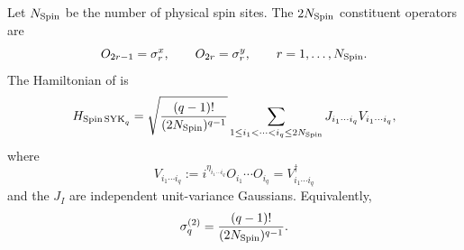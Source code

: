 \documentclass{article}
\theoremstyle{definition}
\begin{document}
Let $N_{\rm Spin}$ be the number of physical spin sites.  The
$2N_{\rm Spin}$ constituent operators are
\begin{equation}
    O_{2r-1}=\sigma_r^x,
    \qquad
    O_{2r}=\sigma_r^y,
    \qquad
    r=1,\ldots,N_{\rm Spin}.
\end{equation}
The Hamiltonian of \cite{basu2026complexity} is
\begin{equation}
    H_{{\rm Spin\,SYK}_q}
    =\sqrt{\frac{(q-1)!}{(2N_{\rm Spin})^{q-1}}}
    \sum_{1\le i_1<\cdots<i_q\le2N_{\rm Spin}}
    J_{i_1\cdots i_q}V_{i_1\cdots i_q},
\end{equation}
where
\begin{equation}
    V_{i_1\cdots i_q}
    :=i^{\eta_{i_1\cdots i_q}}O_{i_1}\cdots O_{i_q}
    =V_{i_1\cdots i_q}^\dagger
\end{equation}
and the $J_I$ are independent unit-variance Gaussians.  Equivalently,
\begin{equation}
    \sigma_q^{(2)}
    =\frac{(q-1)!}{(2N_{\rm Spin})^{q-1}}.
\end{equation}
\end{document}
